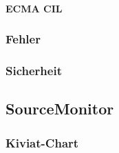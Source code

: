 \paragraph{ECMA CIL}

\subsubsection{Fehler}

\subsubsection{Sicherheit}


\subsection{SourceMonitor}

\subsubsection{Kiviat-Chart}
